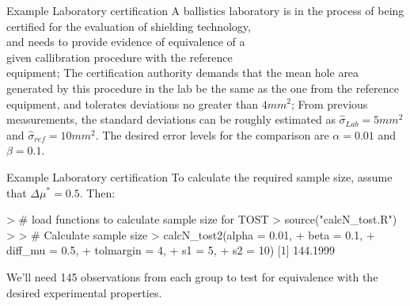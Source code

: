 \documentclass[t]{beamer}
\begin{document}

\begin{ftst}
{Example}
{Laboratory certification}
A ballistics laboratory is in the process of being\\
certified for the evaluation of shielding technology,\\
and needs to provide evidence of equivalence of a\\
given callibration procedure with the reference\\equipment;
\vone
The certification authority demands that the mean hole area generated by this procedure in the lab be the same as the one from the reference equipment, and tolerates deviations no greater than $4 mm^2$;
\vone
From previous measurements, the standard deviations can be roughly estimated as $\hat{\sigma}_{Lab} = 5 mm^2$ and $\hat{\sigma}_{ref} = 10 mm^2$.
\vone
The desired error levels for the comparison are $\alpha=0.01$ and $\beta = 0.1$.

\end{ftst}


\begin{ftstf}
{Example}
{Laboratory certification}
To calculate the required sample size, assume that $\Delta\mu^* = 0.5$. Then:
\begin{rcode}
> # load functions to calculate sample size for TOST
> source("calcN_tost.R")
> 
> # Calculate sample size
> calcN_tost2(alpha = 0.01,
+             beta = 0.1,
+             diff_mu = 0.5,
+             tolmargin = 4,
+             s1 = 5,
+             s2 = 10)
[1] 144.1999
\end{rcode}
\vhalf
We'll need 145 observations from each group to test for equivalence with the desired experimental properties.
\end{ftstf}

\end{document}
